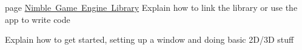 
\begin{DoxyRefList}
\item[page \mbox{\hyperlink{index}{Nimble Game Engine Library}} ]\label{todo__todo000001}%
%
Explain how to link the library or use the app to write code 

\label{todo__todo000002}%
%
Explain how to get started, setting up a window and doing basic 2D/3D stuff
\end{DoxyRefList}